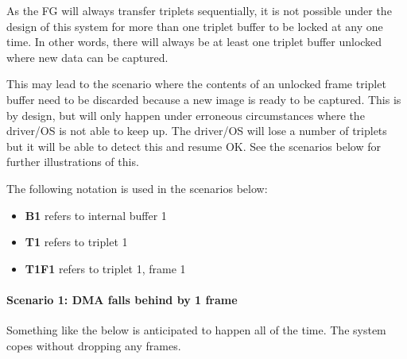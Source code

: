 \documentclass[12pt]{article}
\begin{document}
As the FG will always transfer triplets sequentially, it is not possible under the design of this system for more than one triplet buffer to be locked at any one time. In other words, there will always be at least one triplet buffer unlocked where new data can be captured.

This may lead to the scenario where the contents of an unlocked frame triplet buffer need to be discarded because a new image is ready to be captured. This is by design, but will only happen under erroneous circumstances where the driver/OS is not able to keep up. The driver/OS will lose a number of triplets but it will be able to detect this and resume OK. See the scenarios below for further illustrations of this.

The following notation is used in the scenarios below:

\begin{itemize}
\item \textbf{B1} refers to internal buffer 1
\item \textbf{T1} refers to triplet 1
\item \textbf{T1F1} refers to triplet 1, frame 1
\end{itemize}

\paragraph{Scenario 1: DMA falls behind by 1 frame}
Something like the below is anticipated to happen all of the time. The system copes without dropping any frames.
\end{document}
